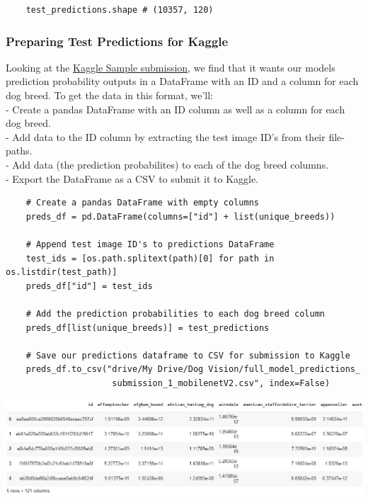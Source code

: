 \documentclass[11pt, a4paper]{article}
\begin{document}
\begin{spacing}{1.1}
\begin{lstlisting}
	test_predictions.shape # (10357, 120) \end{lstlisting} \vspace*{1mm}
	\subsubsection{Preparing Test Predictions for Kaggle}
	Looking at the \href{https://www.kaggle.com/c/dog-breed-identification/overview/evaluation}{Kaggle Sample submission}, we find that it wants our models prediction probability outputs in a DataFrame with an ID and a column for each dog breed. To get the data in this format, we'll: \vspace*{1mm} \\
	\hspace*{2mm} - Create a pandas DataFrame with an ID column as well as a column for each dog breed. \\
	\hspace*{2mm} - Add data to the ID column by extracting the test image ID's from their file-paths. \\
	\hspace*{2mm} - Add data (the prediction probabilites) to each of the dog breed columns. \\
	\hspace*{2mm} - Export the DataFrame as a CSV to submit it to Kaggle.
	\begin{lstlisting}
	# Create a pandas DataFrame with empty columns
	preds_df = pd.DataFrame(columns=["id"] + list(unique_breeds))
	
	# Append test image ID's to predictions DataFrame
	test_ids = [os.path.splitext(path)[0] for path in os.listdir(test_path)]
	preds_df["id"] = test_ids
	
	# Add the prediction probabilities to each dog breed column
	preds_df[list(unique_breeds)] = test_predictions
	
	# Save our predictions dataframe to CSV for submission to Kaggle
	preds_df.to_csv("drive/My Drive/Dog Vision/full_model_predictions_
	                 submission_1_mobilenetV2.csv",	index=False) \end{lstlisting} \vspace*{1mm}                          
	\includegraphics[scale=.65]{kaggle_sub} \newpage


\end{spacing}
\end{document}

